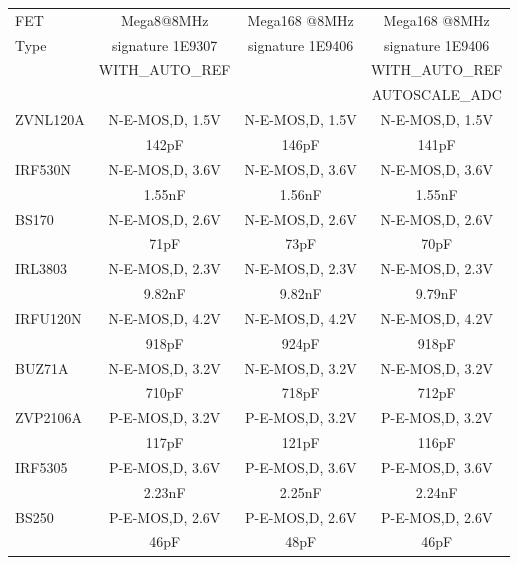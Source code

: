 \begin{table}[H]
  \begin{center}
    \begin{tabular}{| l | c | c | c |}
    \hline
     FET & Mega8@8MHz & Mega168 @8MHz & Mega168 @8MHz \\
    Type    & signature 1E9307 & signature 1E9406 & signature 1E9406 \\
           & WITH\_AUTO\_REF &  & WITH\_AUTO\_REF \\
           &                 &  & AUTOSCALE\_ADC \\
    \hline
    \hline
ZVNL120A     & N-E-MOS,D, 1.5V  & N-E-MOS,D, 1.5V  & N-E-MOS,D, 1.5V \\
             & 142pF            & 146pF            & 141pF \\
    \hline
IRF530N      & N-E-MOS,D, 3.6V  & N-E-MOS,D, 3.6V  & N-E-MOS,D, 3.6V \\
             & 1.55nF           & 1.56nF           & 1.55nF \\
    \hline
BS170        & N-E-MOS,D, 2.6V  & N-E-MOS,D, 2.6V  & N-E-MOS,D, 2.6V \\
             &  71pF            &  73pF            &  70pF \\
    \hline
IRL3803      & N-E-MOS,D, 2.3V  & N-E-MOS,D, 2.3V  & N-E-MOS,D, 2.3V \\
             & 9.82nF           & 9.82nF           & 9.79nF \\
    \hline
IRFU120N     & N-E-MOS,D, 4.2V  & N-E-MOS,D, 4.2V  & N-E-MOS,D, 4.2V \\
             & 918pF            & 924pF            & 918pF \\
    \hline
BUZ71A       & N-E-MOS,D, 3.2V  & N-E-MOS,D, 3.2V  & N-E-MOS,D, 3.2V \\
             & 710pF            & 718pF            & 712pF \\
    \hline
ZVP2106A     & P-E-MOS,D, 3.2V  & P-E-MOS,D, 3.2V  & P-E-MOS,D, 3.2V \\
             & 117pF            & 121pF            & 116pF \\
    \hline
IRF5305      & P-E-MOS,D, 3.6V  & P-E-MOS,D, 3.6V  & P-E-MOS,D, 3.6V \\
             & 2.23nF           & 2.25nF           & 2.24nF \\
    \hline
BS250        & P-E-MOS,D, 2.6V  & P-E-MOS,D, 2.6V  & P-E-MOS,D, 2.6V \\
             & 46pF             & 48pF             & 46pF \\

\end{tabular}
\end{center}
\end{table}
